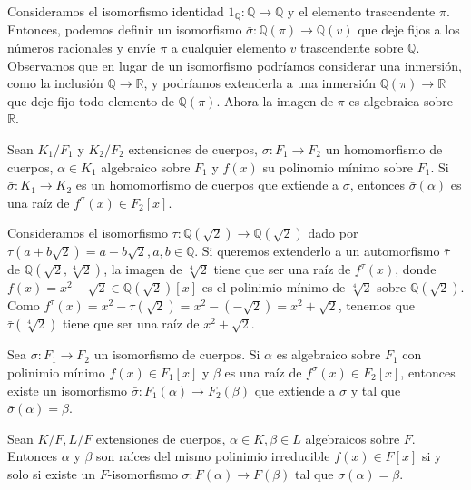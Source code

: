 \begin{example}
    Consideramos el isomorfismo identidad $1_\mathbb{Q} : \mathbb{Q} \to \mathbb{Q}$ y el elemento trascendente $\pi$.
    Entonces, podemos definir un isomorfismo $\bar{\sigma} : \mathbb{Q}(\pi) \to \mathbb{Q}(v)$ que deje fijos a los números racionales y envíe $\pi$ a cualquier elemento $v$ trascendente sobre $\mathbb{Q}$.
    Observamos que en lugar de un isomorfismo podríamos considerar una inmersión, como la inclusión $\mathbb{Q} \to \mathbb{R}$, y podríamos extenderla a una inmersión $\mathbb{Q}(\pi) \to \mathbb{R}$ que deje fijo todo elemento de $\mathbb{Q}(\pi)$.
    Ahora la imagen de $\pi$ es algebraica sobre $\mathbb{R}$.
\end{example}

\begin{proposition}
    Sean $K_1/F_1$ y $K_2/F_2$ extensiones de cuerpos, $\sigma : F_1 \to F_2$ un homomorfismo de cuerpos, $\alpha \in K_1$ algebraico sobre $F_1$ y $f(x)$ su polinomio mínimo sobre $F_1$.
    Si $\bar{\sigma} : K_1 \to K_2$ es un homomorfismo de cuerpos que extiende a $\sigma$, entonces $\bar{\sigma}(\alpha)$ es una raíz de $f^\sigma(x) \in F_2[x]$.
\end{proposition}

\begin{example}
    Consideramos el isomorfismo $\tau : \mathbb{Q}(\sqrt{2}) \to \mathbb{Q}(\sqrt{2})$ dado por $\tau(a + b\sqrt{2}) = a - b\sqrt{2}, a, b \in \mathbb{Q}$.
    Si queremos extenderlo a un automorfismo $\bar{\tau}$ de $\mathbb{Q}(\sqrt{2}, \sqrt[4]{2})$, la imagen de $\sqrt[4]{2}$ tiene que ser una raíz de $f^\tau(x)$, donde $f(x) = x^2 - \sqrt{2} \in \mathbb{Q}(\sqrt{2})[x]$ es el polinimio mínimo de $\sqrt[4]{2}$ sobre $\mathbb{Q}(\sqrt{2})$.
    Como $f^\tau(x) = x^2 - \tau(\sqrt{2}) = x^2 - (-\sqrt{2}) = x^2 + \sqrt{2}$, tenemos que $\bar{\tau}(\sqrt[4]{2})$ tiene que ser una raíz de $x^2 + \sqrt{2}$.
\end{example}

\begin{theorem}
    Sea $\sigma : F_1 \to F_2$ un isomorfismo de cuerpos.
    Si $\alpha$ es algebraico sobre $F_1$ con polinimio mínimo $f(x) \in F_1[x]$ y $\beta$ es una raíz de $f^\sigma(x) \in F_2[x]$, entonces existe un isomorfismo $\bar{\sigma} : F_1(\alpha) \to F_2(\beta)$ que extiende a $\sigma$ y tal que $\bar{\sigma}(\alpha) = \beta$.
\end{theorem}

\begin{corollary}
    Sean $K/F, L/F$ extensiones de cuerpos, $\alpha \in K, \beta \in L$ algebraicos sobre $F$.
    Entonces $\alpha$ y $\beta$ son raíces del mismo polinimio irreducible $f(x) \in F[x]$ si y solo si existe un $F$-isomorfismo $\sigma : F(\alpha) \to F(\beta)$ tal que $\sigma(\alpha) = \beta$.
\end{corollary}

